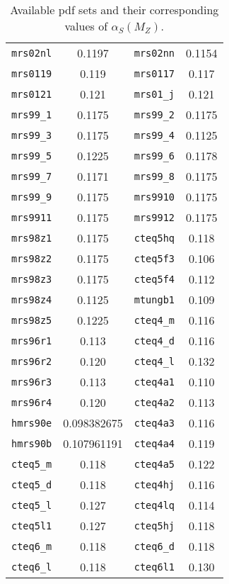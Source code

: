 \documentclass[12pt]{article}
\begin{document}
\begin{table}[h]
\begin{center}
\begin{tabular}{|c|c||c|c|}
\hline
{\tt mrs02nl}   & 0.1197       & {\tt mrs02nn}  & 0.1154  \\
{\tt mrs0119}   & 0.119        & {\tt mrs0117}  & 0.117   \\
{\tt mrs0121}   & 0.121        & {\tt mrs01\_j} & 0.121   \\
{\tt mrs99\_1}  & 0.1175       & {\tt mrs99\_2} & 0.1175  \\
{\tt mrs99\_3}  & 0.1175       & {\tt mrs99\_4} & 0.1125  \\    
{\tt mrs99\_5}  & 0.1225       & {\tt mrs99\_6} & 0.1178  \\    
{\tt mrs99\_7}  & 0.1171       & {\tt mrs99\_8} & 0.1175  \\    
{\tt mrs99\_9}  & 0.1175       & {\tt mrs9910}  & 0.1175  \\    
{\tt mrs9911}   & 0.1175       & {\tt mrs9912}  & 0.1175  \\    
{\tt mrs98z1}   &  0.1175      & {\tt cteq5hq}  &  0.118  \\
{\tt mrs98z2}   &  0.1175      & {\tt cteq5f3}  &  0.106  \\
{\tt mrs98z3}   &  0.1175      & {\tt cteq5f4}  &  0.112  \\
{\tt mrs98z4}   &  0.1125      & {\tt mtungb1}  &  0.109  \\
{\tt mrs98z5}   &  0.1225      & {\tt cteq4\_m} &  0.116  \\
{\tt mrs96r1}   &  0.113       & {\tt cteq4\_d} &  0.116  \\
{\tt mrs96r2}   &  0.120       & {\tt cteq4\_l} &  0.132  \\
{\tt mrs96r3}   &  0.113       & {\tt cteq4a1}  &  0.110  \\
{\tt mrs96r4}   &  0.120       & {\tt cteq4a2}  &  0.113  \\
{\tt hmrs90e}   &  0.098382675 & {\tt cteq4a3}  &  0.116  \\
{\tt hmrs90b}   &  0.107961191 & {\tt cteq4a4}  &  0.119  \\
{\tt cteq5\_m}  &  0.118       & {\tt cteq4a5}  &  0.122  \\
{\tt cteq5\_d}  &  0.118       & {\tt cteq4hj}  &  0.116  \\
{\tt cteq5\_l}  &  0.127       & {\tt cteq4lq}  &  0.114  \\
{\tt cteq5l1}   &  0.127       & {\tt cteq5hj}  &  0.118  \\
{\tt cteq6\_m}  &  0.118       & {\tt cteq6\_d} &  0.118  \\
{\tt cteq6\_l}  &  0.118       & {\tt cteq6l1}  &  0.130  \\
\hline
\end{tabular}
\end{center}
\caption{Available pdf sets and their corresponding values of
$\alpha_S(M_Z)$.}
\label{pdlabel}
\end{table}
\end{document}
